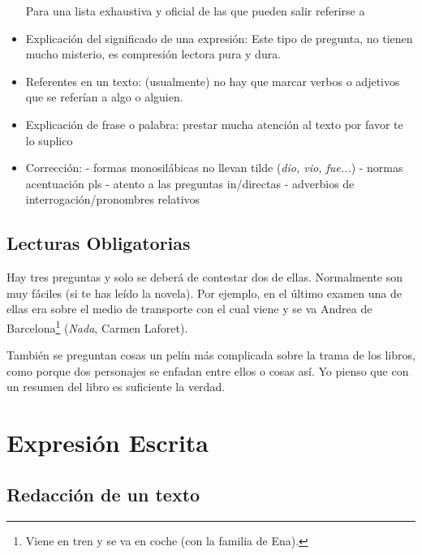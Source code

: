 \documentclass[arial,a4paper,print]{article}
\begin{document}
\begin{itemize}
Para una lista exhaustiva y oficial de las que pueden salir referirse a  

\item Explicación del significado de una expresión: Este tipo de pregunta, no tienen mucho misterio, es compresión lectora pura y dura. 

\item Referentes en un texto: (usualmente) no hay que marcar verbos o adjetivos que se referían a algo o alguien. 

\item Explicación de frase o palabra: prestar mucha atención al texto por favor te lo suplico

\item Corrección:
\subitem - formas monosilábicas no llevan tilde (\textit{dio, vio, fue...})
\subitem - normas acentuación pls
\subitem - atento a las preguntas in/directas
\subitem - adverbios de interrogación/pronombres relativos


\end{itemize}

\subsection{Lecturas Obligatorias}
Hay tres preguntas y solo se deberá de contestar dos de ellas. Normalmente son muy fáciles (si te has leído la novela). Por ejemplo, en el último examen una de ellas era sobre el medio de transporte con el cual viene y se va Andrea de Barcelona\footnote{Viene en tren y se va en coche (con la familia de Ena).} (\textit{Nada}, Carmen Laforet). 

También se preguntan cosas un pelín más complicada sobre la trama de los libros, como porque dos personajes se enfadan entre ellos o cosas así. Yo pienso que con un resumen del libro es suficiente la verdad. 

\section{Expresión Escrita}
\subsection{Redacción de un texto}
\end{document}
